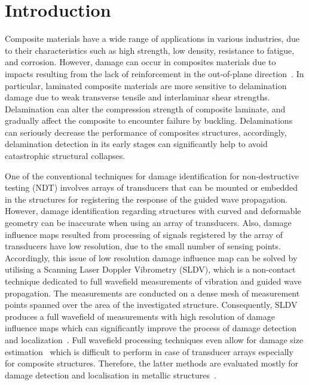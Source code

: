 \documentclass[preprint,9pt]{elsarticle}
\begin{document}
\section{Introduction}
Composite materials have a wide range of applications in various industries, due to their characteristics such as high strength, low density, resistance to fatigue, and corrosion.  
However, damage can occur in composites materials due to impacts resulting from the lack of reinforcement in the out-of-plane direction~\cite{Francesconi2019}.
In particular, laminated composite materials are more sensitive to delamination damage due to weak transverse tensile and interlaminar shear strengths.
Delamination can alter the compression strength of composite laminate, and gradually affect the composite to encounter failure by buckling. 
Delaminations can seriously decrease the performance of composites structures, accordingly, delamination detection in its early stages can significantly help to avoid catastrophic structural collapses.
	
One of the conventional techniques for damage identification for non-destru\-ctive testing (NDT) involves arrays of transducers that can be mounted or embedded in the structures for registering the response of the guided wave propagation.
However, damage identification regarding structures with curved and deformable geometry can be inaccurate when using an array of transducers.
Also, damage influence maps resulted from processing of signals registered by the array of transducers have low resolution, due to the small number of sensing points. 
Accordingly, this issue of low resolution damage influence map can be solved by utilising a Scanning Laser Doppler Vibrometry (SLDV), which is a non-contact technique dedicated to full wavefield measurements of vibration and guided wave propagation.
The measurements are conducted on a dense mesh of measurement points spanned over the area of the investigated structure.
Consequently, SLDV produces a full wavefield of measurements with high resolution of damage influence maps which can significantly improve the process of damage detection and localization~\cite{Michaels2007,Park2014,Tian2015a,Kudela2015}.
Full wavefield processing techniques even allow for damage size estimation~\cite{Girolamo2018a,Kudela2018} which is difficult to perform in case of transducer arrays especially for composite structures.
Therefore, the latter methods are evaluated mostly for damage detection and localisation in metallic structures~\cite{Michaels2008,Huang2018a,Wang2020}.
\end{document}
